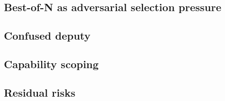 \subsection{Best-of-N as adversarial selection pressure}

\subsection{Confused deputy}

\subsection{Capability scoping}

\subsection{Residual risks}
